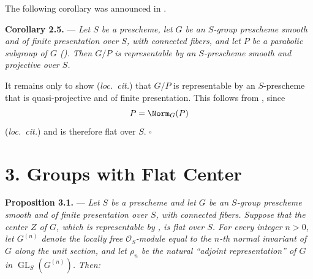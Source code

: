 The following corollary was announced in .

\medskip
\noindent{}%
\textbf{Corollary 2.5.} --- \textit{Let \(S\) be a prescheme, let
\(G\) be an \(S\)-group prescheme smooth and of finite presentation
over \(S\), with connected fibers, and let \(P\) be a parabolic
subgroup of \(G\) (). Then \(G/P\) is
representable by an \(S\)-prescheme smooth and projective over
\(S\).}

It remains only to show (\textit{loc.\ cit.}) that \(G/P\) is
representable by an \(S\)-prescheme that is quasi-projective and of
finite presentation. This follows from , since
\[
  P=\Norm_G(P)
\]
(\textit{loc.\ cit.}) and is therefore flat over \(S\).
\hfill\(\square\)



%
\section*{3. Groups with Flat Center}

\noindent{}%
\textbf{Proposition 3.1.} --- \textit{Let \(S\) be a prescheme and
let \(G\) be an \(S\)-group prescheme smooth and of finite
presentation over \(S\), with connected fibers. Suppose that the
center \(Z\) of \(G\), which is representable by ,
is flat over \(S\). For every integer \(n>0\), let \(G^{(n)}\)
denote the locally free \(\mathcal O_S\)-module equal to the
\(n\)-th normal invariant of \(G\) along the unit section, and let
\(\rho_n\) be the natural ``adjoint representation'' of \(G\) in
\(\operatorname{GL}_S(G^{(n)})\). Then:}

